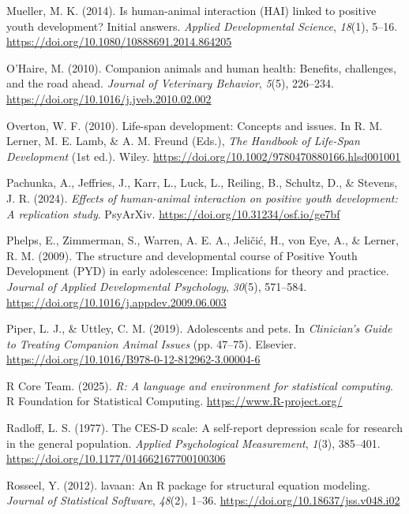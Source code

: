 \documentclass[
  jou,
  longtable,
  nolmodern,
  notxfonts,
  notimes,
  colorlinks=true,linkcolor=blue,citecolor=blue,urlcolor=blue]{apa7}
\newlength{\cslhangindent}
\newenvironment{CSLReferences}[2] %
 {\begin{list}{}{%
  \setlength{\itemindent}{0pt}
  \setlength{\leftmargin}{0pt}
  \setlength{\parsep}{0pt}
  \ifodd #1
   \setlength{\leftmargin}{\cslhangindent}
   \setlength{\itemindent}{-1\cslhangindent}
  \fi
  \setlength{\itemsep}{#2\baselineskip}}}
 {\end{list}}
\begin{document}
\begin{CSLReferences}{1}{0}
Mueller, M. K. (2014). Is human-animal interaction ({HAI}) linked to
positive youth development? {Initial} answers. \emph{Applied
Developmental Science}, \emph{18}(1), 5--16.
\url{https://doi.org/10.1080/10888691.2014.864205}

O'Haire, M. (2010). Companion animals and human health: {Benefits},
challenges, and the road ahead. \emph{Journal of Veterinary Behavior},
\emph{5}(5), 226--234. \url{https://doi.org/10.1016/j.jveb.2010.02.002}

Overton, W. F. (2010). Life-span development: Concepts and issues. In R.
M. Lerner, M. E. Lamb, \& A. M. Freund (Eds.), \emph{The {Handbook} of
{Life}-{Span Development}} (1st ed.). Wiley.
\url{https://doi.org/10.1002/9780470880166.hlsd001001}

Pachunka, A., Jeffries, J., Karr, L., Luck, L., Reiling, B., Schultz,
D., \& Stevens, J. R. (2024). \emph{Effects of human-animal interaction
on positive youth development: {A} replication study}. PsyArXiv.
\url{https://doi.org/10.31234/osf.io/ge7bf}

Phelps, E., Zimmerman, S., Warren, A. E. A., Jeličić, H., von Eye, A.,
\& Lerner, R. M. (2009). The structure and developmental course of
{Positive Youth Development} ({PYD}) in early adolescence:
{Implications} for theory and practice. \emph{Journal of Applied
Developmental Psychology}, \emph{30}(5), 571--584.
\url{https://doi.org/10.1016/j.appdev.2009.06.003}

Piper, L. J., \& Uttley, C. M. (2019). Adolescents and pets. In
\emph{Clinician's {Guide} to {Treating Companion Animal Issues}} (pp.
47--75). Elsevier.
\url{https://doi.org/10.1016/B978-0-12-812962-3.00004-6}

R Core Team. (2025). \emph{R: A language and environment for statistical
computing}. R Foundation for Statistical Computing.
\url{https://www.R-project.org/}

Radloff, L. S. (1977). The {CES-D} scale: A self-report depression scale
for research in the general population. \emph{Applied Psychological
Measurement}, \emph{1}(3), 385--401.
\url{https://doi.org/10.1177/014662167700100306}

Rosseel, Y. (2012). {lavaan}: An {R} package for structural equation
modeling. \emph{Journal of Statistical Software}, \emph{48}(2), 1--36.
\url{https://doi.org/10.18637/jss.v048.i02}


\end{CSLReferences}
\end{document}
